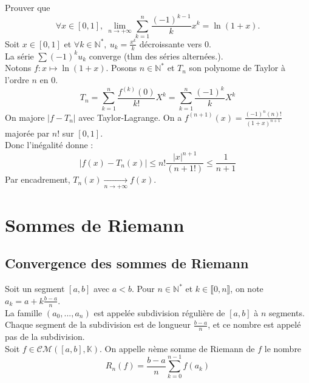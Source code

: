 \documentclass[11pt]{article}
\newcommand*{\K}{\mathbb{K}}
\newcommand*{\N}{\mathbb{N}}
\newcommand*{\CM}{\mathcal{CM}}
\newcommand{\0}{\varnothing}
\newcommand*{\lb}{\llbracket}
\newcommand*{\rb}{\rrbracket}
\begin{document}
\begin{ex}{}{}
    Prouver que 
    \begin{equation*}
        \forall x \in [0,1], ~ \lim_{n\to+\infty}\sum_{k=1}^n\frac{(-1)^{k-1}}{k}x^k=\ln(1+x).
    \end{equation*}
    \tcblower
    Soit $x\in[0,1]$ et $\forall k\in\N^*, ~ u_k = \frac{x^k}{k}$ décroissante vers 0.\\
    La série $\sum(-1)^ku_k$ converge (thm des séries alternées.).\\
    Notons $f:x\mapsto\ln(1+x)$. Posons $n\in\N^*$ et $T_n$ son polynome de Taylor à l'ordre $n$ en 0.
    \begin{equation*}
        T_n = \sum_{k=1}^n\frac{f^{(k)}(0)}{k!}X^k=\sum_{k=1}^n\frac{(-1)^k}{k}X^k
    \end{equation*}
    On majore $|f-T_n|$ avec Taylor-Lagrange. On a $f^{(n+1)}(x)=\frac{(-1)^n(n)!}{(1+x)^{n+1}}$ majorée par $n!$ sur $[0,1]$.\\
    Donc l'inégalité donne :
    \begin{equation*}
        |f(x)-T_n(x)|\leq n!\frac{|x|^{n+1}}{(n+1!)}\leq\frac{1}{n+1}
    \end{equation*}
    Par encadrement, $T_n(x)\xrightarrow[n\to+\infty]{} f(x)$.
\end{ex}

\section{Sommes de Riemann}
\subsection{Convergence des sommes de Riemann}

\begin{defi}{}{}
    Soit un segment $[a,b]$ avec $a<b$. Pour $n\in\N^*$ et $k\in\lb0,n\rb$, on note $a_k=a+k\frac{b-a}{n}$.\\
    La famille $(a_0,...,a_n)$ est appelée subdivision régulière de $[a,b]$ à $n$ segments. Chaque segment de la subdivision est de longueur $\frac{b-a}{n}$, et ce nombre est appelé pas de la subdivision.\\
    Soit $f\in\CM([a,b], \K)$. On appelle $n$ème somme de Riemann de $f$ le nombre
    \begin{equation*}
        R_n(f)=\frac{b-a}{n}\sum_{k=0}^{n-1}f(a_k)
    \end{equation*}
\end{defi}
\end{document}
